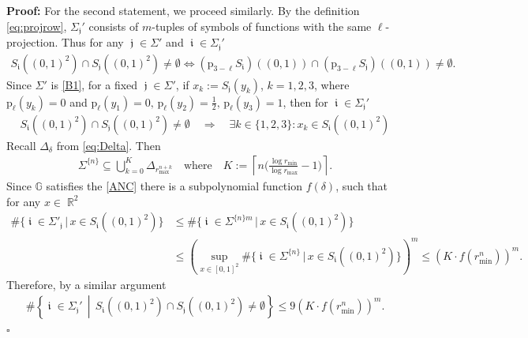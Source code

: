 \documentclass[a4paper, 11pt]{article}
\newenvironment{Proof}{\noindent \textbf{Proof:}}{\hfill$\square$\\}
\DeclareMathOperator{\R}{\mathbb{R}}
\DeclareMathOperator{\iii}{\mathfrak{i}}
\DeclareMathOperator{\jjj}{\mathfrak{j}}
\numberwithin{equation}{section}
\theoremstyle{plain}
\theoremstyle{remark}
\theoremstyle{definition}
\begin{document}
\begin{Proof}
For the second statement, we proceed similarly. 
By the definition \eqref{eq:projrow}, $\Sigma_{\jjj}'$ consists of $m$-tuples of symbols of functions with the same $\ell$-projection. Thus for any $\jjj \in \Sigma'$ and $\iii \in \Sigma_{\jjj}'$
\begin{align*}
S_{\iii}((0,1)^2) \cap S_{\jjj}((0,1)^2) \neq \emptyset \iff (\mathrm{p}_{3-\ell}S_{\iii})((0,1)) \cap (\mathrm{p}_{3-\ell}S_{\jjj})((0,1)) \neq \emptyset.
\end{align*}
Since $\Sigma'$ is \ref{B1}, for a fixed $\jjj \in \Sigma'$, if $x_k :=S_{\jjj}(y_k)$, $k = 1,2,3$, where $\mathrm{p}_\ell(y_k) =0$ and $\mathrm{p}_\ell(y_1) =0,\, \mathrm{p}_\ell(y_2) = \tfrac{1}{2},\, \mathrm{p}_\ell(y_3) = 1$, then for $\iii \in \Sigma_{\jjj}'$
\begin{align*}
S_{\iii}((0,1)^2) \cap S_{\jjj}((0,1)^2) \neq \emptyset \quad \Longrightarrow \quad \exists k \in \{1,2,3\}: x_k \in S_{\iii}((0,1)^2)
\end{align*}
Recall $\Delta_\delta$ from \eqref{eq:Delta}. Then 
\begin{align*}
\Sigma^{\{n\}} \subseteq \bigcup_{k = 0}^K \Delta_{r_{\max}^{n+k}} \quad \text{where} \quad K := \left\lceil n \Big( \frac{\log r_{\min}}{\log r_{\max}}-1\Big) \right\rceil.
\end{align*}
Since $\mathbb{G}$ satisfies the \ref{ANC} there is a subpolynomial function $f(\delta)$, such that for any $x \in \R^2$
\begin{align*}
\#\big\{\iii \in \Sigma'_{\jjj} \, \big|\, x \in S_{\iii}((0,1)^2) \big\} &\leq \#\big\{\iii \in \Sigma^{\{n\}m} \, \big|\, x \in S_{\iii}((0,1)^2) \big\} \\ &\leq \left(\sup_{x\in[0,1]^2}\#\big\{\iii \in \Sigma^{\{n\}} \, \big|\, x \in S_{\iii}((0,1)^2) \big\}\right)^m \leq (K \cdot f(r_{\min}^n))^m.
\end{align*}
Therefore, by a similar argument
\begin{align*}
\# \left\{\iii \in \Sigma_{\jjj}' \, \middle|\, S_{\iii}((0,1)^2) \cap S_{\jjj}((0,1)^2) \neq \emptyset \right\} \leq 9 (K \cdot f(r_{\min}^n))^m.
\end{align*}
\end{Proof}
\end{document}
